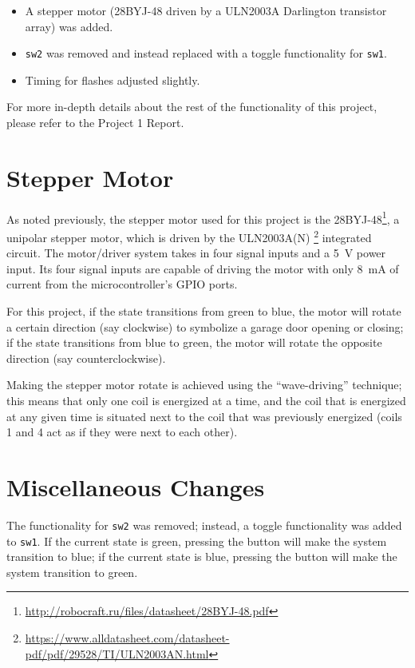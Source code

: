 \documentclass{article}
\renewcommand{\c}[1]{\texttt{#1}}
\begin{document}
\begin{itemize}
    \item A stepper motor (28BYJ-48 driven by a ULN2003A
    Darlington transistor array) was added.
    \item \c{sw2} was removed and instead replaced with a
    toggle functionality for \c{sw1}.
    \item Timing for flashes adjusted slightly.
\end{itemize}

For more in-depth details about the rest of the functionality
of this project, please refer to the Project 1 Report.

\section{Stepper Motor} As noted previously, the stepper
motor used for this project is the
28BYJ-48\footnote{\url{http://robocraft.ru/files/datasheet/28BYJ-48.pdf}}, a unipolar
stepper motor, which is driven by the ULN2003A(N)%
\footnote{\url{https://www.alldatasheet.com/datasheet-pdf/pdf/29528/TI/ULN2003AN.html}}
integrated circuit. The motor/driver system takes
in four signal inputs and a \SI{5}{V} power input. Its four
signal inputs are capable of driving the motor with only
\SI{8}{\milli\ampere} of current from the microcontroller's
GPIO ports.

For this project, if the state transitions from green to
blue, the motor will rotate a certain direction (say clockwise)
to symbolize a garage door opening or closing; if the state
transitions from blue to green, the motor will rotate the
opposite direction (say counterclockwise).

Making the stepper motor rotate is achieved using the
``wave-driving'' technique; this means that only one coil is
energized at a time, and the coil that is energized at any
given time is situated next to the coil that was previously
energized (coils 1 and 4 act as if they were next to each other).

\section{Miscellaneous Changes} The functionality for \c{sw2}
was removed; instead, a toggle functionality was added to \c{sw1}.
If the current state is green, pressing the button will
make the system transition to blue;
if the current state is blue, pressing the button will
make the system transition to green.
\end{document}
